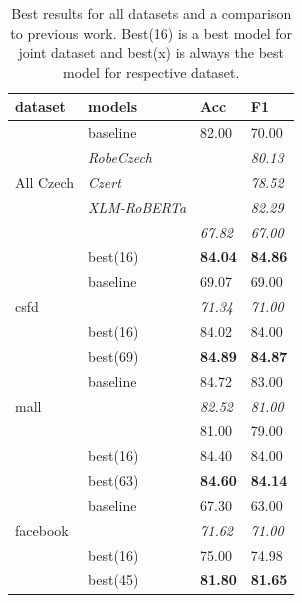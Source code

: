 \begin{table}[!h]
\centering
\begin{tabular}{|l|l||ll|}
\hline
dataset                    & models      & Acc   & F1    \\ \hline \hline
\multirow{5}{*}{All Czech} & baseline    & 82.00 & 70.00 \\ \cline{2-4} 
                           & \textit{RobeCzech }  &       & \textit{80.13} \\ \cline{2-4} 
                           & \textit{Czert}       &       & \textit{78.52} \\ \cline{2-4} 
                           & \textit{XLM-RoBERTa} &       & \textit{82.29} \\ \cline{2-4} 
                           & \textit{\citep{kysely}} & \textit{67.82} & \textit{67.00} \\ \cline{2-4}
                           & best(16)    & \textbf{84.04} & \textbf{84.86} \\ \hline \hline
\multirow{3}{*}{csfd}      & baseline    & 69.07 & 69.00 \\ \cline{2-4} 
& \textit{\citep{kysely}} & \textit{71.34} & \textit{71.00} \\ \cline{2-4}
                           & best(16)    & 84.02 & 84.00\\ \cline{2-4} 
                           & best(69)    & \textbf{84.89 }& \textbf{84.87} \\ \hline \hline
\multirow{3}{*}{mall}      & baseline    & 84.72 & 83.00 \\ \cline{2-4} 
& \textit{\citep{kysely}} & \textit{82.52} & \textit{81.00} \\ \cline{2-4}
& \textit{\citep{Klouda}} & 81.00 & 79.00 \\ \cline{2-4}
                           & best(16)    & 84.40 & 84.00 \\ \cline{2-4} 
                           & best(63)    & \textbf{84.60} & \textbf{84.14} \\ \hline \hline
\multirow{3}{*}{facebook}  & baseline    & 67.30 & 63.00 \\ \cline{2-4} 
& \textit{\citep{kysely}} & \textit{71.62} & \textit{71.00} \\ \cline{2-4}
                           & best(16)    & 75.00 & 74.98 \\ \cline{2-4} 
                           & best(45)    & \textbf{81.80} & \textbf{81.65} \\ \hline
\end{tabular}
\caption{Best results for all datasets and a comparison to previous work. Best(16) is a best model for joint dataset and best(x) is always the best model for respective dataset.}
\label{tab:res_sent_best}
\end{table}

